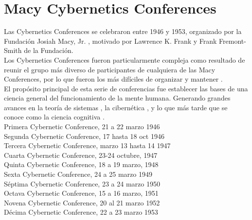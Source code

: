\documentclass[a4paper,12pt]{article}
\begin{document}
\section{Macy Cybernetics Conferences}
Las Cybernetics Conferences se celebraron entre 1946 y 1953, organizado por la Fundaci\'on Josiah Macy, Jr. ,
 motivado por Lawrence K. Frank y Frank Fremont-Smith de la Fundación.
\\
Los Cybernetics Conferences fueron particularmente compleja como resultado de reunir el grupo m\'as diverso de participantes de 
cualquiera de las Macy Conferences, por lo que fueron los m\'as dif\'{i}ciles de organizar y mantener .
\\
El prop\'osito principal de esta serie de conferencias fue establecer las bases de una ciencia general del funcionamiento de la mente 
humana. Generando grandes avances en la teor\'{i}a de sistemas , la cibern\'etica , y lo que m\'as tarde que se conoce como la ciencia cognitiva .
\\
Primera Cybernetic Conference, 21 a 22 marzo 1946\\
Segunda Cybernetic Conference, 17 hasta 18 oct 1946\\
Tercera Cybernetic Conference, marzo 13 hasta 14 1947\\
Cuarta Cybernetic Conference, 23-24 octubre, 1947\\
Quinta Cybernetic Conference, 18 a 19 marzo, 1948\\
Sexta Cybernetic Conference, 24 a 25 marzo 1949\\
Séptima Cybernetic Conference, 23 a 24 marzo 1950\\
Octava Cybernetic Conference, 15 a 16 marzo, 1951\\
Novena Cybernetic Conference, 20 al 21 marzo 1952\\
Décima Cybernetic Conference, 22 a 23 marzo 1953\\
                                                                                                                                                                                                                                                                       
\end{document}

